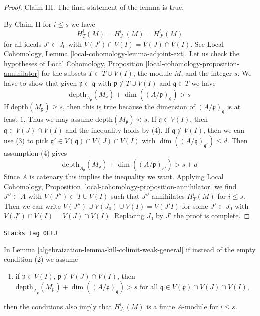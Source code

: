 \begin{proof}
\medskip\noindent
Claim III. The final statement of the lemma is true.

\medskip\noindent
By Claim II for $i \leq s$ we have
$$
H^i_T(M) = H^i_{J_0}(M) = H^i_{J'}(M)
$$
for all ideals $J' \subset J_0$ with $V(J')  \cap V(I) = V(J) \cap V(I)$.
See Local Cohomology, Lemma \ref{local-cohomology-lemma-adjoint-ext}.
Let us check the hypotheses of Local Cohomology,
Proposition \ref{local-cohomology-proposition-annihilator}
for the subsets $T \subset T \cup V(I)$, the module $M$, and the integer $s$.
We have to show that given $\mathfrak p \subset \mathfrak q$
with $\mathfrak p \not \in T \cup V(I)$ and $\mathfrak q \in T$
we have
$$
\text{depth}_{A_\mathfrak p}(M_\mathfrak p) +
\dim((A/\mathfrak p)_\mathfrak q) > s
$$
If $\text{depth}(M_\mathfrak p) \geq s$, then this is true because
the dimension of $(A/\mathfrak p)_\mathfrak q$ is at least $1$.
Thus we may assume $\text{depth}(M_\mathfrak p) < s$.
If $\mathfrak q \in V(I)$, then $\mathfrak q \in V(J) \cap V(I)$
and the inequality holds by (4). If $\mathfrak q \not \in V(I)$,
then we can use (3) to pick
$\mathfrak q' \in V(\mathfrak q) \cap V(J) \cap V(I)$ with
$\dim((A/\mathfrak q)_{\mathfrak q'}) \leq d$.
Then assumption (4) gives
$$
\text{depth}_{A_\mathfrak p}(M_\mathfrak p) +
\dim((A/\mathfrak p)_{\mathfrak q'}) > s + d
$$
Since $A$ is catenary this implies the inequality we want.
Applying Local Cohomology,
Proposition \ref{local-cohomology-proposition-annihilator} we
find $J'' \subset A$ with $V(J'') \subset T \cup V(I)$
such that $J''$ annihilates $H^i_T(M)$ for $i \leq s$.
Then we can write $V(J'') \cup V(J_0) \cup V(I) = V(J'I)$
for some $J' \subset J_0$ with $V(J') \cap V(I) = V(J) \cap V(I)$.
Replacing $J_0$ by $J'$ the proof is complete.
\end{proof}

\begin{lemma}
\label{algebraization-lemma-kill-colimit-general}
\href{https://stacks.math.columbia.edu/tag/0EFJ}{\texttt{Stacks tag 0EFJ}}

In Lemma \ref{algebraization-lemma-kill-colimit-weak-general} if instead of the empty
condition (2) we assume
\begin{enumerate}
\item[(2')] if $\mathfrak p \in V(I)$, $\mathfrak p \not \in V(J) \cap V(I)$,
then
$\text{depth}_{A_\mathfrak p}(M_\mathfrak p) +
\dim((A/\mathfrak p)_\mathfrak q) > s$
for all $\mathfrak q \in V(\mathfrak p) \cap V(J) \cap V(I)$,
\end{enumerate}
then the conditions also imply that $H^i_{J_0}(M)$ is a finite
$A$-module for $i \leq s$.
\end{lemma}

